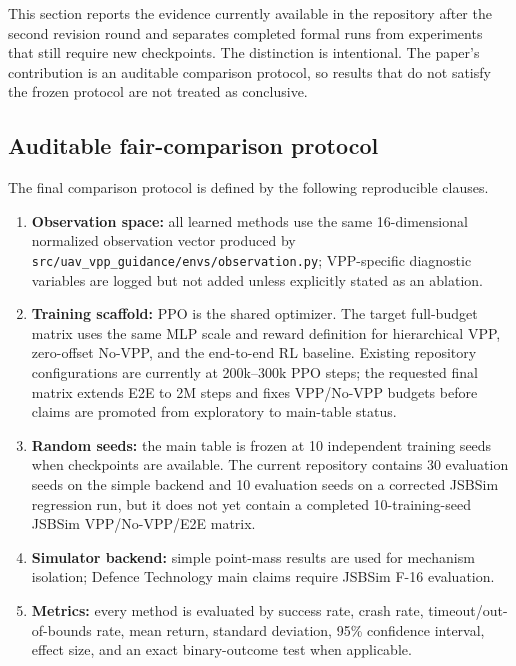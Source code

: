 This section reports the evidence currently available in the repository after the second revision round and separates completed formal runs from experiments that still require new checkpoints. The distinction is intentional. The paper's contribution is an auditable comparison protocol, so results that do not satisfy the frozen protocol are not treated as conclusive.

\subsection{Auditable fair-comparison protocol}\label{sec:fair_protocol}

The final comparison protocol is defined by the following reproducible clauses.

\begin{enumerate}
    \item \textbf{Observation space:} all learned methods use the same 16-dimensional normalized observation vector produced by \texttt{src/uav\_vpp\_guidance/envs/observation.py}; VPP-specific diagnostic variables are logged but not added unless explicitly stated as an ablation.
    \item \textbf{Training scaffold:} PPO is the shared optimizer. The target full-budget matrix uses the same MLP scale and reward definition for hierarchical VPP, zero-offset No-VPP, and the end-to-end RL baseline. Existing repository configurations are currently at 200k--300k PPO steps; the requested final matrix extends E2E to 2M steps and fixes VPP/No-VPP budgets before claims are promoted from exploratory to main-table status.
    \item \textbf{Random seeds:} the main table is frozen at 10 independent training seeds when checkpoints are available. The current repository contains 30 evaluation seeds on the simple backend and 10 evaluation seeds on a corrected JSBSim regression run, but it does not yet contain a completed 10-training-seed JSBSim VPP/No-VPP/E2E matrix.
    \item \textbf{Simulator backend:} simple point-mass results are used for mechanism isolation; Defence Technology main claims require JSBSim F-16 evaluation.
    \item \textbf{Metrics:} every method is evaluated by success rate, crash rate, timeout/out-of-bounds rate, mean return, standard deviation, 95\% confidence interval, effect size, and an exact binary-outcome test when applicable.
\end{enumerate}

